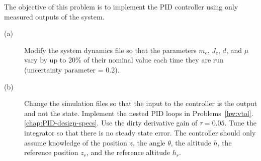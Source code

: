 The objective of this problem is to implement the PID controller using only measured outputs of the system.
\begin{description}
\item[(a)]  Modify the system dynamics file so that the parameters $m_c$, $J_c$, $d$, and $\mu$ vary by up to 20\% of their nominal value each time they are run (uncertainty parameter = 0.2).
\item[(b)]  Change the simulation files so that the input to the controller is the output and not the state.   Implement the nested PID loops in Problems~\ref{hw:vtol}.\ref{chap:PID-design-specs}.  Use the dirty derivative gain of $\tau=0.05$.  Tune the integrator so that there is no steady state error. The controller should only assume knowledge of the position $z$, the angle $\theta$, the altitude $h$, the reference position $z_r$, and the reference altitude $h_r$.
\end{description}
